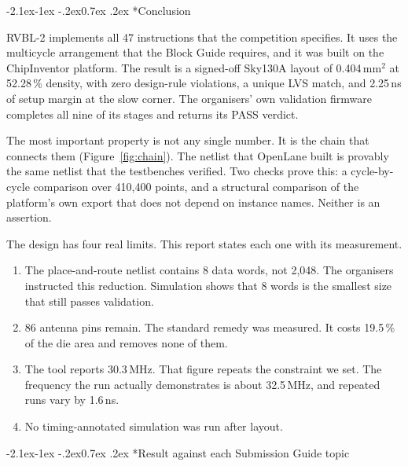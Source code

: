 \documentclass[11pt,a4paper]{article}
\makeatletter
\newcommand{\needlines}[1]{%
  \par
  \ifdim\pagegoal=\maxdimen\else
    \ifdim\dimexpr\pagegoal-\pagetotal\relax<\dimexpr#1\baselineskip\relax
      \newpage
    \fi
  \fi}
\renewcommand\subsection{\@startsection{subsection}{2}{\z@}%
  {-2.1ex\@plus -1ex \@minus -.2ex}{0.7ex \@plus .2ex}%
  {\color{rvbldark}\normalfont\normalsize\bfseries}}
\makeatother
\begin{document}
\subsection*{\color{rvbl}Conclusion}

RVBL-2 implements all 47 instructions that the competition specifies. It uses the
multicycle arrangement that the Block Guide requires, and it was built on the ChipInventor
platform. The result is a signed-off Sky130A layout of 0.404\,mm$^2$ at 52.28\,\% density,
with zero design-rule violations, a unique LVS match, and 2.25\,ns of setup margin at the
slow corner. The organisers' own validation firmware completes all nine of its stages and
returns its PASS verdict.

The most important property is not any single number. It is the chain that connects them
(Figure~\ref{fig:chain}). The netlist that OpenLane built is provably the same netlist that
the testbenches verified. Two checks prove this: a cycle-by-cycle comparison over 410{,}400
points, and a structural comparison of the platform's own export that does not depend on
instance names. Neither is an assertion.

The design has four real limits. This report states each one with its measurement.
\begin{enumerate}[leftmargin=1.35em,itemsep=1pt,topsep=2pt]
\item The place-and-route netlist contains 8 data words, not 2{,}048. The organisers
  instructed this reduction. Simulation shows that 8 words is the smallest size that still
  passes validation.
\item 86 antenna pins remain. The standard remedy was measured. It costs 19.5\,\% of the die
  area and removes none of them.
\item The tool reports 30.3\,MHz. That figure repeats the constraint we set. The frequency
  the run actually demonstrates is about 32.5\,MHz, and repeated runs vary by 1.6\,ns.
\item No timing-annotated simulation was run after layout.
\end{enumerate}

\needlines{12}
\subsection*{\color{rvbldark}Result against each Submission Guide topic}
\end{document}

